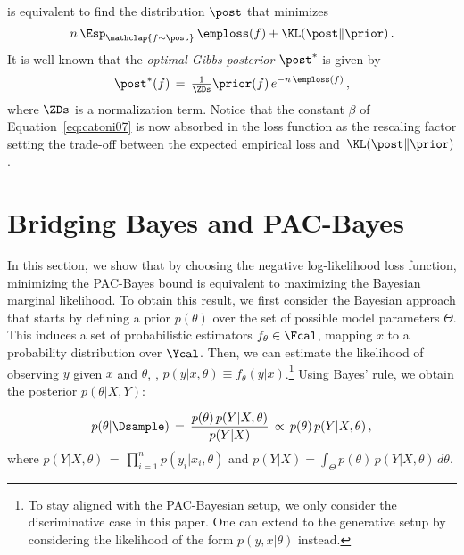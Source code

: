 \documentclass{article}
\theoremstyle{definition}
\theoremstyle{plain}
\begin{document}
%
is equivalent to find the distribution $\post$ that minimizes
\begin{equation}\label{eq:a_minimser_beta}
n\,\Esp_{\mathclap{f\sim\post}}\, \emploss(f)  +  \KL(\post\|\prior)\,.
\end{equation}
%
It is well known \citep{alquier-15,catoni-07,graal-icml09,lever-13} that the \emph{optimal Gibbs posterior} $\post^*$ is given by
%
\begin{equation}\label{eq:post_catoni}
\post^*(f) \, = \, \tfrac1{\ZDs} \prior(f) \,e^{-n\,\emploss(f)}\,,
\end{equation}
where $\ZDs$ is a normalization term. Notice that the constant $\beta$ of Equation~\eqref{eq:catoni07} is now absorbed in the loss function as the rescaling factor 
setting the trade-off between the expected empirical loss and~$\KL(\post\|\prior)$. 
%


%


\section{Bridging Bayes and PAC-Bayes}
\label{section:marginal_likelihood}


In this section, we show that by choosing the negative log-likelihood loss function,
%
minimizing the PAC-Bayes bound is equivalent to maximizing the Bayesian marginal likelihood.
%
%
%
%
To obtain this result, we first consider the Bayesian approach that starts by defining a prior $p(\theta)$ over the set of possible model parameters $\Theta$. This induces a set of probabilistic estimators $f_\theta \in \Fcal$, mapping $x$ to a probability distribution over $\Ycal$. Then, we can estimate the likelihood of observing $y$ given $x$ and $\theta$, \ie, $p(y|x,\theta) \equiv f_\theta(y|x)$.\footnote{To stay aligned with the PAC-Bayesian setup, we only consider the discriminative case in this paper. One can extend to the generative setup by considering the likelihood of the form $p(y,x|\theta)$ instead.} Using Bayes' rule, we obtain the posterior $p(\theta|X,Y)$:
\begin{samepage}
\begin{equation} \label{eq:bayes_updaterule}
p(\theta|\Dsample) 
\,=\, \frac{p(\theta)\,p(Y|X,\theta)}{p(Y|X)}
\, \propto\, 
p(\theta)\,p(Y|X,\theta)\,,
\end{equation}
where $p(Y|X,\theta) \, = \, \prod_{i=1}^n p(y_i|x_i,\theta)$ and 
%
$p(Y|X) = \int_\Theta p(\theta) \,p(Y|X,\theta)\, d\theta$.
\end{samepage}
\end{document}
